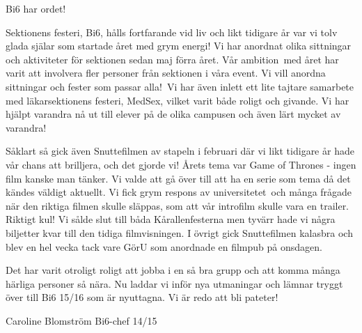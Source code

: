 Bi6 har ordet!

Sektionens festeri, Bi6, hålls fortfarande vid liv och likt tidigare år var vi tolv glada själar som startade året med grym energi! Vi har anordnat olika sittningar och aktiviteter för sektionen sedan maj förra året. Vår ambition med året har varit att involvera fler personer från sektionen i våra event. Vi vill anordna sittningar och fester som passar alla! Vi har även inlett ett lite tajtare samarbete med läkarsektionens festeri, MedSex, vilket varit både roligt och givande. Vi har hjälpt varandra nå ut till elever på de olika campusen och även lärt mycket av varandra!

Såklart så gick även Snuttefilmen av stapeln i februari där vi likt tidigare år hade vår chans att brilljera, och det gjorde vi! Årets tema var Game of Thrones - ingen film kanske man tänker. Vi valde att gå över till att ha en serie som tema då det kändes väldigt aktuellt. Vi fick grym respons av universitetet och många frågade när den riktiga filmen skulle släppas, som att vår introfilm skulle vara en trailer. Riktigt kul! Vi sålde slut till båda Kårallenfesterna men tyvärr hade vi några biljetter kvar till den tidiga filmvisningen. I övrigt gick Snuttefilmen kalasbra och blev en hel vecka tack vare GörU som anordnade en filmpub på onsdagen.

Det har varit otroligt roligt att jobba i en så bra grupp och att komma många härliga personer så nära. Nu laddar vi inför nya utmaningar och lämnar tryggt över till Bi6 15/16 som är nyuttagna.
Vi är redo att bli pateter!

Caroline Blomström
Bi6-chef 14/15